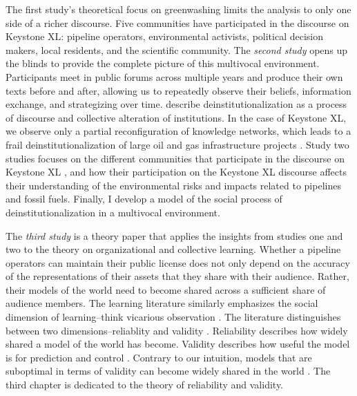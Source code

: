 The first study's theoretical focus on greenwashing limits the analysis to only one side of a richer discourse. Five communities have participated in the discourse on Keystone XL: pipeline operators, environmental activists, political decision makers, local residents, and the scientific community. The \textit{second study} opens up the blinds to provide the complete picture of this multivocal environment. Participants meet in public forums across multiple years \citep{Latour2005} and produce their own texts before and after, allowing us to repeatedly observe their beliefs, information exchange, and strategizing over time. \citet{Maguire2009} describe deinstitutionalization as a process of discourse and collective alteration of institutions. In the case of Keystone XL, we observe only a partial reconfiguration of knowledge networks, which leads to a frail deinstitutionalization of large oil and gas infrastructure projects \citep[cf.][]{Latour1984}. Study two studies focuses on the different communities that participate in the discourse on Keystone XL \citep{Aronczyk2019,KnorrCetina1999}, and how their participation on the Keystone XL discourse affects their understanding of the environmental risks and impacts related to pipelines and fossil fuels. Finally, I develop a model of the social process of deinstitutionalization in a multivocal environment.

The \textit{third study} is a theory paper that applies the insights from studies one and two to the theory on organizational and collective learning. Whether a pipeline operators can maintain their public license does not only depend on the accuracy of the representations of their assets that they share with their audience. Rather, their models of the world need to become shared across a sufficient share of audience members. The learning literature similarly emphasizes the social dimension of learning--think vicarious observation \citep{Madsen2018}. The literature distinguishes between two dimensions--reliablity and validity \citep{March1991a}. Reliability describes how widely shared a model of the world has become. Validity describes how useful the model is for prediction and control \citep{Rerup2021}. Contrary to our intuition, models that are suboptimal in terms of validity can become widely shared in the world \citep{Levitt1988}. The third chapter is dedicated to the theory of reliability and validity.